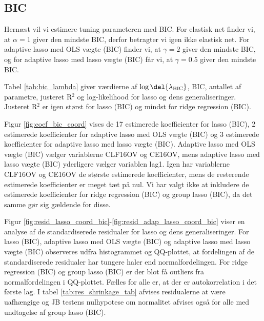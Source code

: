 \subsection{BIC}
Hernæst vil vi estimere tuning parameteren med BIC.
For elastisk net finder vi, at $\alpha = 1$ giver den mindste BIC, derfor betragter vi igen ikke elastisk net.
For adaptive lasso med OLS vægte (BIC) finder vi, at $\gamma = 2$ giver den mindste BIC, og for adaptive lasso med lasso vægte (BIC) får vi, at $\gamma = 0.5$ giver den mindste BIC. 

Tabel \ref{tab:bic_lambda} giver værdierne af $\log \del{ \lambda_\text{BIC}}$, BIC, antallet af parametre, justeret R$^2$ og log-likelihood for lasso og dens generaliseringer. 
Justeret R$^2$ er igen størst for lasso (BIC) og mindst for ridge regression (BIC).



Figur \ref{fig:coef_bic_coord} vises de 17 estimerede koefficienter for lasso (BIC), 2 estimerede koefficienter for adaptive lasso med OLS vægte (BIC) og 3 estimerede koefficienter for adaptive lasso med lasso vægte (BIC).
Adaptive lasso med OLS vægte (BIC) vælger variablerne \textcolor{blue3}{CLF16OV} og \textcolor{blue3}{CE16OV}, mens adaptive lasso med lasso vægte (BIC) yderligere vælger variablen \textcolor{blue3}{lag1}. 
Igen har variablerne \textcolor{blue3}{CLF16OV} og \textcolor{blue3}{CE16OV} de største estimerede koefficienter, mens de resterende estimerede koefficienter er meget tæt på nul. 
Vi har valgt ikke at inkludere de estimerede koefficienter for ridge regression (BIC) og group lasso (BIC), da det samme gør sig gældende for disse.


Figur \ref{fig:resid_lasso_coord_bic}-\ref{fig:resid_adap_lasso_coord_bic} viser en analyse af de standardiserede residualer for lasso og dens generaliseringer.
For lasso (BIC), adaptive lasso med OLS vægte (BIC) og adaptive lasso med lasso vægte (BIC) observeres udfra histogrammet og QQ-plottet, at fordelingen af de standardiserede residualer har tungere haler end normalfordelingen.
For ridge regression (BIC) og group lasso (BIC) er der blot få outliers fra normalfordelingen i QQ-plottet.
Fælles for alle er, at der er autokorrelation i det første lag. 
I tabel \ref{tab:res_shrinkage_tab} afvises residualerne at være uafhængige og JB testens nulhypotese om normalitet afvises også for alle med undtagelse af group lasso (BIC).

